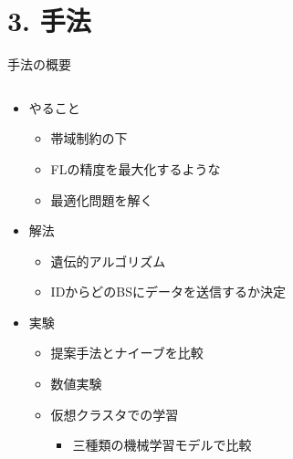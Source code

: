 \documentclass[unicode,12pt,aspectratio=169, dvipdfmx]{beamer}
\begin{document}
    \section{3. 手法}
    \begin{frame}{手法の概要}
        \begin{columns}
            \begin{column}[]{.8\linewidth}
                \begin{itemize}
                    \item やること
                    \begin{itemize}
                        \item 帯域制約の下
                        \item FLの精度を最大化するような
                        \item 最適化問題を解く
                    \end{itemize}
                    \item 解法
                    \begin{itemize}
                        \item 遺伝的アルゴリズム
                        \item IDからどのBSにデータを送信するか決定
                    \end{itemize}
                    \item 実験
                    \begin{itemize}
                        \item 提案手法とナイーブを比較
                        \item 数値実験
                        \item 仮想クラスタでの学習
                        \begin{itemize}
                            \item 三種類の機械学習モデルで比較
                        \end{itemize}
                    \end{itemize}
                \end{itemize}
            \end{column}
        \end{columns}
    \end{frame}
\end{document}
